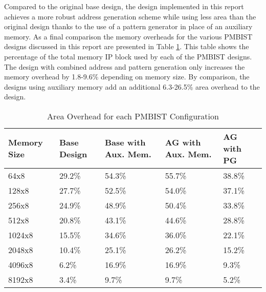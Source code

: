 Compared to the original base design, the design implemented in this report achieves a more robust address generation scheme while using less area than the original design thanks to the use of a pattern generator in place of an auxiliary memory.  As a final comparison the memory overheads for the various PMBIST designs discussed in this report are presented in Table \ref{tab:all_overhead}.  This table shows the percentage of the total memory IP block used by each of the PMBIST designs.  The design with combined address and pattern generation only increases the memory overhead by 1.8-9.6\% depending on memory size.  By comparison, the designs using auxiliary memory add an additional 6.3-26.5\% area overhead to the design.  

\begin{table}[h]
\caption{Area Overhead for each PMBIST Configuration}
\centering
\begin{tabular}{|p{0.75in}| p{0.6in}| p{0.9in}| p{0.9in}| p{0.6in}|}
\hline
Memory Size & Base Design & Base with Aux. Mem. & AG with Aux. Mem. & AG with PG  \\
\hline\hline
64x8   & 29.2\% & 54.3\% & 55.7\% & 38.8\% \\
128x8  & 27.7\% & 52.5\% & 54.0\% & 37.1\% \\
256x8  & 24.9\% & 48.9\% & 50.4\% & 33.8\% \\
512x8  & 20.8\% & 43.1\% & 44.6\% & 28.8\% \\
1024x8 & 15.5\% & 34.6\% & 36.0\% & 22.1\% \\
2048x8 & 10.4\% & 25.1\% & 26.2\% & 15.2\% \\
4096x8 &  6.2\% & 16.9\% & 16.9\% &  9.3\% \\
8192x8 &  3.4\% &  9.7\% &  9.7\% &  5.2\% \\ [0.5ex]
\hline
\end{tabular}
\label{tab:all_overhead}
\end{table}




